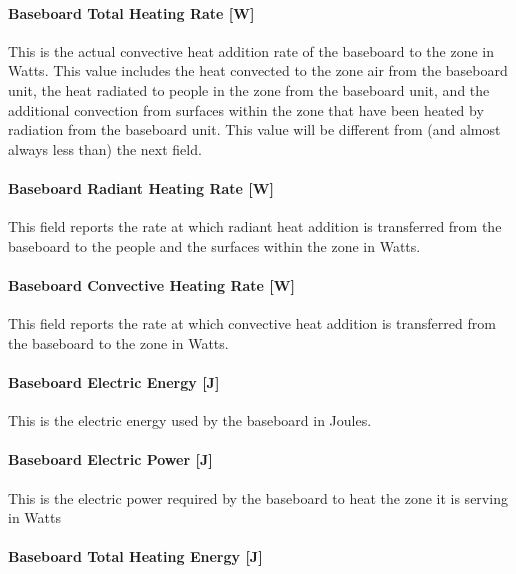 \paragraph{Baseboard Total Heating Rate {[}W{]}}\label{baseboard-total-heating-rate-w-2}

This is the actual convective heat addition rate of the baseboard to the zone in Watts. This value includes the heat convected to the zone air from the baseboard unit, the heat radiated to people in the zone from the baseboard unit, and the additional convection from surfaces within the zone that have been heated by radiation from the baseboard unit. This value will be different from (and almost always less than) the next field.

\paragraph{Baseboard Radiant Heating Rate {[}W{]}}\label{baseboard-radiant-heating-rate-w-2}

This field reports the rate at which radiant heat addition is transferred from the baseboard to the people and the surfaces within the zone in Watts.

\paragraph{Baseboard Convective Heating Rate {[}W{]}}\label{baseboard-convective-heating-rate-w-2}

This field reports the rate at which convective heat addition is transferred from the baseboard to the zone in Watts.

\paragraph{Baseboard Electric Energy {[}J{]}}\label{baseboard-electric-energy-j-000}

This is the electric energy used by the baseboard in Joules.

\paragraph{Baseboard Electric Power {[}J{]}}\label{baseboard-electric-power-j}

This is the electric power required by the baseboard to heat the zone it is serving in Watts

\paragraph{Baseboard Total Heating Energy {[}J{]}}\label{baseboard-total-heating-energy-j-2}

